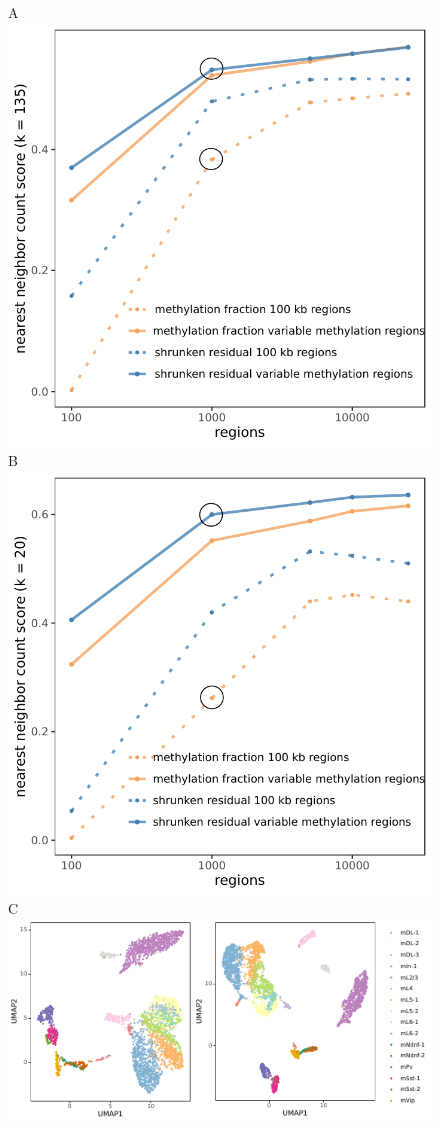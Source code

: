 \documentclass[twocolumn,10pt]{article}
\begin{document}
\begin{figure}[!htp]
	A\\
	\hspace{.3cm}\includegraphics[width=.7\columnwidth]{part_leonie_git/leonie_plots/complete_135k_12cm_log.pdf} \\
	B\\
	\hspace{.3cm}\includegraphics[width=.7\columnwidth]{part_leonie_git/leonie_plots/cell500_20k_12cm_log.pdf} \\
	C\\
	\hspace{.39cm}\includegraphics[width=\columnwidth]{part_leonie_git/leonie_plots/UMAP_fulldataset.pdf}

\end{figure}
\end{document}
